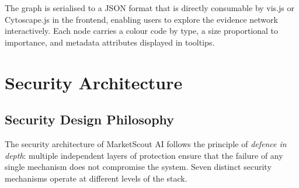 \documentclass[12pt,a4paper,oneside]{book}
\begin{document}
The graph is serialised to a JSON format that is directly consumable by vis.js or Cytoscape.js in the frontend, enabling users to explore the evidence network interactively. Each node carries a colour code by type, a size proportional to importance, and metadata attributes displayed in tooltips.

\chapter{Security Architecture}
\label{chap:security}

\section{Security Design Philosophy}

The security architecture of MarketScout AI follows the principle of \emph{defence in depth}: multiple independent layers of protection ensure that the failure of any single mechanism does not compromise the system. Seven distinct security mechanisms operate at different levels of the stack.
\end{document}

